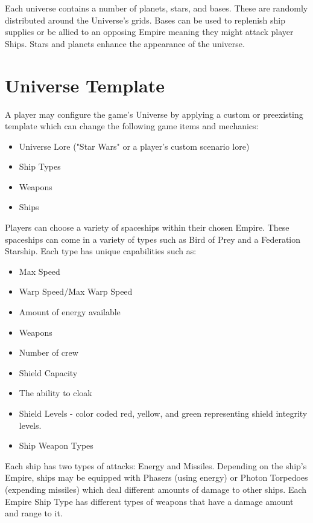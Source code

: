 Each universe contains a number of planets, stars, and bases. These are randomly distributed around the Universe's grids. Bases can be used to replenish ship supplies or be allied to an opposing Empire meaning they might attack player Ships. Stars and planets enhance the appearance of the universe.

\section{Universe Template}

 A player may configure the game's Universe by applying a custom or preexisting template which can change the following game items and mechanics:

\begin{itemize}
	\item Universe Lore ("Star Wars" or a player's custom scenario lore)
	\item Ship Types
	\item Weapons
	\item Ships
\end{itemize}

Players can choose a variety of spaceships within their chosen Empire. These spaceships can come in a variety of types such as Bird of Prey and a Federation Starship. Each type has unique capabilities such as:

\begin{itemize}
	\item Max Speed
	\item Warp Speed/Max Warp Speed
	\item Amount of energy available
	\item Weapons
	\item Number of crew
	\item Shield Capacity
	\item The ability to cloak
	\item Shield Levels - color coded red, yellow, and green representing shield integrity levels.
	\item Ship Weapon Types
\end{itemize}

 Each ship has two types of attacks: Energy and Missiles. Depending on the ship's Empire, ships may be equipped with Phasers (using energy) or Photon Torpedoes (expending missiles)  which deal different amounts of damage to other ships. Each Empire Ship Type has different types of weapons that have a damage amount and range to it.

